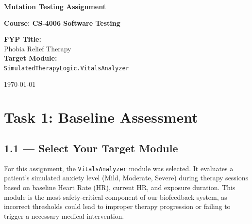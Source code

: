 \documentclass[11pt,a4paper]{article}
\begin{document}
\begin{titlepage}
    \centering
    \vspace*{2cm}
    
    {\Huge\bfseries\color{secondary} Mutation Testing Assignment\par}
    \vspace{1cm}
    {\Large\bfseries Course: CS-4006 Software Testing\par}
    \vspace{2cm}
    
    \begin{tcolorbox}[colback=white, colframe=primary, width=0.8\textwidth, center, arc=5mm]
        \centering
        \vspace{0.5cm}
        {\large\bfseries FYP Title:}\\[0.2cm]
        {\Large Phobia Relief Therapy}\\[0.5cm]
        {\large\bfseries Target Module:}\\[0.2cm]
        {\Large \texttt{SimulatedTherapyLogic.VitalsAnalyzer}}\\[0.5cm]
        \vspace{0.5cm}
    \end{tcolorbox}
    
    \vfill
    
    {\large \today\par}
\end{titlepage}

\tableofcontents
\newpage

\section{Task 1: Baseline Assessment}

\subsection{1.1 — Select Your Target Module}
For this assignment, the \texttt{VitalsAnalyzer} module was selected. It evaluates a patient's simulated anxiety level (Mild, Moderate, Severe) during therapy sessions based on baseline Heart Rate (HR), current HR, and exposure duration. This module is the most safety-critical component of our biofeedback system, as incorrect thresholds could lead to improper therapy progression or failing to trigger a necessary medical intervention.
\end{document}

